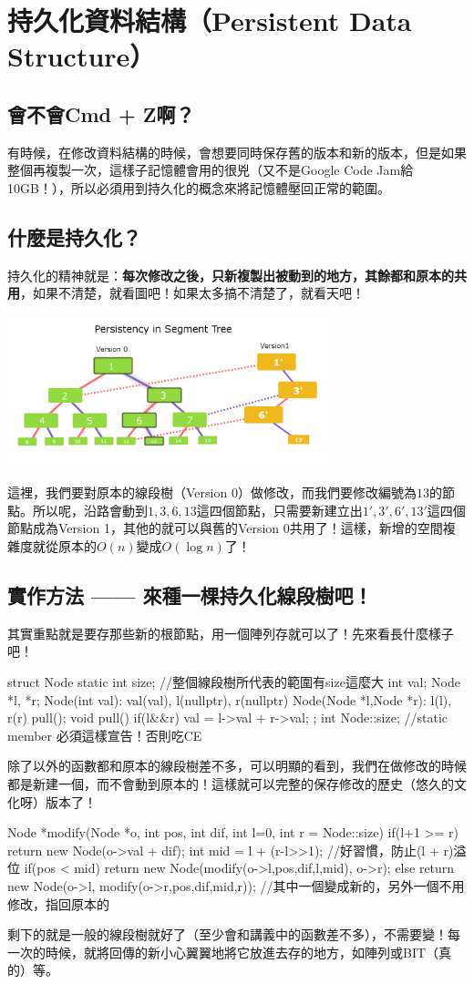 \documentclass[main.tex]{subfiles}
\begin{document}
	\section{持久化資料結構（Persistent Data Structure）}
		\subsection{會不會Cmd + Z啊？}
			有時候，在修改資料結構的時候，會想要同時保存舊的版本和新的版本，但是如果整個再複製一次，這樣子記憶體會用的很兇（又不是Google Code Jam給10GB！），所以必須用到持久化的概念來將記憶體壓回正常的範圍。
		\subsection{什麼是持久化？}
			持久化的精神就是：\textbf{每次修改之後，只新複製出被動到的地方，其餘都和原本的共用}，如果不清楚，就看圖吧！如果太多搞不清楚了，就看天吧！
			\begin{center}
				\includegraphics*[width = 0.7\textwidth]{images/persistent}
			\end{center}
			這裡，我們要對原本的線段樹（Version 0）做修改，而我們要修改編號為$13$的節點。所以呢，沿路會動到$1, 3, 6, 13$這四個節點，只需要新建立出$1', 3', 6', 13'$這四個節點成為Version 1，其他的就可以與舊的Version 0共用了！這樣，新增的空間複雜度就從原本的$O(n)$變成$O(\log n)$了！
		\subsection{實作方法 —— 來種一棵持久化線段樹吧！}
			其實重點就是要存那些新的根節點，用一個陣列存就可以了！先來看長什麼樣子吧！
			\begin{C++}
struct Node{
	static int size; //整個線段樹所代表的範圍有size這麼大
	int val;
	Node *l, *r;
	Node(int val): val(val), l(nullptr), r(nullptr){}
	Node(Node *l,Node *r): l(l), r(r){ pull(); }
	void pull() { if(l&&r) val = l->val + r->val; }
};
int Node::size; //static member 必須這樣宣告！否則吃CE
			\end{C++}
			 除了以外的函數都和原本的線段樹差不多，可以明顯的看到，我們在做修改的時候都是新建一個，而不會動到原本的！這樣就可以完整的保存修改的歷史（悠久的文化呀）版本了！
			 \begin{C++}
Node *modify(Node *o, int pos, int dif, 
					   int l=0, int r = Node::size){ 
	if(l+1 >= r) return new Node(o->val + dif);
	int mid = l + (r-l>>1); //好習慣，防止(l + r)溢位
	if(pos < mid)
		return new Node(modify(o->l,pos,dif,l,mid), o->r); 
	else 
		return new Node(o->l, modify(o->r,pos,dif,mid,r));
	//其中一個變成新的，另外一個不用修改，指回原本的
}
			 \end{C++}
			剩下的就是一般的線段樹就好了（至少會和講義中的函數差不多），不需要變！每一次的時候，就將回傳的新小心翼翼地將它放進去存的地方，如陣列或BIT（真的）等。
\end{document}
